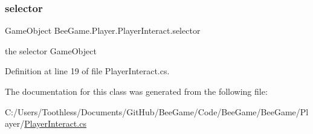 \subsubsection{\texorpdfstring{selector}{selector}}
{\footnotesize\ttfamily Game\+Object Bee\+Game.\+Player.\+Player\+Interact.\+selector\hspace{0.3cm}{\ttfamily [private]}}



the selector Game\+Object 



Definition at line 19 of file Player\+Interact.\+cs.



The documentation for this class was generated from the following file\+:\begin{DoxyCompactItemize}
\item 
C\+:/\+Users/\+Toothless/\+Documents/\+Git\+Hub/\+Bee\+Game/\+Code/\+Bee\+Game/\+Bee\+Game/\+Player/\hyperlink{_player_interact_8cs}{Player\+Interact.\+cs}\end{DoxyCompactItemize}
